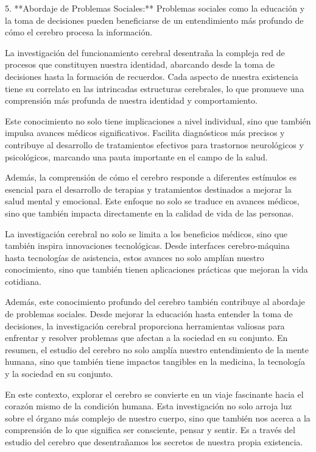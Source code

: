 \documentclass{article}
\begin{document}
	5. **Abordaje de Problemas Sociales:** Problemas sociales como la educación y la toma de decisiones pueden beneficiarse de un entendimiento más profundo de cómo el cerebro procesa la información.
	
	La investigación del funcionamiento cerebral desentraña la compleja red de procesos que constituyen nuestra identidad, abarcando desde la toma de decisiones hasta la formación de recuerdos. Cada aspecto de nuestra existencia tiene su correlato en las intrincadas estructuras cerebrales, lo que promueve una comprensión más profunda de nuestra identidad y comportamiento.
	
	Este conocimiento no solo tiene implicaciones a nivel individual, sino que también impulsa avances médicos significativos. Facilita diagnósticos más precisos y contribuye al desarrollo de tratamientos efectivos para trastornos neurológicos y psicológicos, marcando una pauta importante en el campo de la salud.
	
	Además, la comprensión de cómo el cerebro responde a diferentes estímulos es esencial para el desarrollo de terapias y tratamientos destinados a mejorar la salud mental y emocional. Este enfoque no solo se traduce en avances médicos, sino que también impacta directamente en la calidad de vida de las personas.
	
	La investigación cerebral no solo se limita a los beneficios médicos, sino que también inspira innovaciones tecnológicas. Desde interfaces cerebro-máquina hasta tecnologías de asistencia, estos avances no solo amplían nuestro conocimiento, sino que también tienen aplicaciones prácticas que mejoran la vida cotidiana.
	
	Además, este conocimiento profundo del cerebro también contribuye al abordaje de problemas sociales. Desde mejorar la educación hasta entender la toma de decisiones, la investigación cerebral proporciona herramientas valiosas para enfrentar y resolver problemas que afectan a la sociedad en su conjunto. En resumen, el estudio del cerebro no solo amplía nuestro entendimiento de la mente humana, sino que también tiene impactos tangibles en la medicina, la tecnología y la sociedad en su conjunto.
	
	En este contexto, explorar el cerebro se convierte en un viaje fascinante hacia el corazón mismo de la condición humana. Esta investigación no solo arroja luz sobre el órgano más complejo de nuestro cuerpo, sino que también nos acerca a la comprensión de lo que significa ser consciente, pensar y sentir. Es a través del estudio del cerebro que desentrañamos los secretos de nuestra propia existencia.
	
\end{document}
